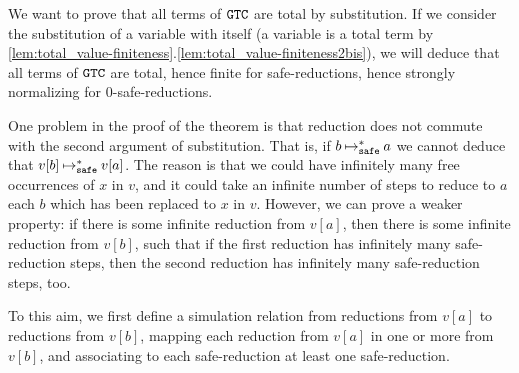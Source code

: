  We want to prove that all terms of ${\tt GTC}$ are total by substitution.
If we consider the substitution of a variable with itself 
(a variable is a total term by 
\ref{lem:total_value-finiteness}.\ref{lem:total_value-finiteness2bis}),
we will deduce that all terms of ${\tt GTC}$ are total, 
hence finite for safe-reductions, hence strongly normalizing for $0$-safe-reductions.

One problem in the proof of the theorem 
is that reduction does not commute with the second argument of substitution. 
That is, if $b \mathbin{\mathbin{\mapsto}_{\hbox{\scriptsize \tt safe}}^*} a$ we cannot deduce that $v[b] \mathbin{\mathbin{\mapsto}_{\hbox{\scriptsize \tt safe}}^*} v[a]$. 
The reason is that we could have infinitely many free occurrences of 
$x$ in $v$, and it could take
an infinite number of steps to reduce to $a$ 
each $b$ which has been replaced to $x$ in $v$.
However, we can prove a weaker property: 
if there is some infinite reduction from $v[a]$, 
then there is some infinite reduction from $v[b]$,
such that if the first reduction has infinitely many safe-reduction steps,
then the second reduction has infinitely many safe-reduction steps, too.

To this aim, we first define a simulation relation from reductions
from $v[a]$ to reductions from $v[b]$, mapping each reduction from $v[a]$ 
in one or more from $v[b]$, and associating to each safe-reduction at least
one safe-reduction.

